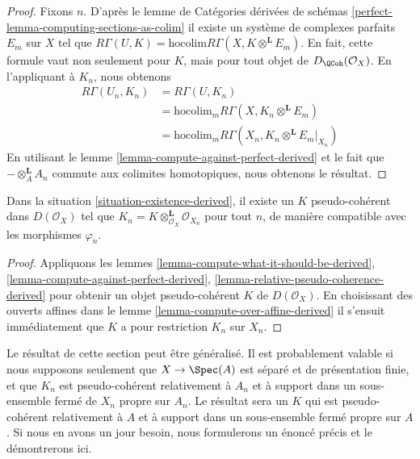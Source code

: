 \begin{proof}
Fixons $n$. D'après le lemme de Catégories dérivées de schémas
\ref{perfect-lemma-computing-sections-as-colim}
il existe un système de complexes parfaits $E_m$
sur $X$ tel que
$R\Gamma(U, K) = \text{hocolim} R\Gamma(X, K \otimes^\mathbf{L} E_m)$.
En fait, cette formule vaut non seulement pour $K$, mais pour tout objet de
$D_\QCoh(\mathcal{O}_X)$.
En l'appliquant à $K_n$,
nous obtenons
\begin{align*}
R\Gamma(U_n, K_n)
& =
R\Gamma(U, K_n) \\
& =
\text{hocolim}_m R\Gamma(X, K_n \otimes^\mathbf{L} E_m) \\
& =
\text{hocolim}_m R\Gamma(X_n, K_n \otimes^\mathbf{L} E_m|_{X_n})
\end{align*}
En utilisant le lemme \ref{lemma-compute-against-perfect-derived}
et le fait que $- \otimes_A^\mathbf{L} A_n$
commute aux colimites homotopiques, nous obtenons le résultat.
\end{proof}

\begin{theorem}
\label{theorem-existence-derived}
Dans la situation \ref{situation-existence-derived},
il existe un $K$ pseudo-cohérent dans $D(\mathcal{O}_X)$
tel que $K_n = K \otimes_{\mathcal{O}_X}^\mathbf{L} \mathcal{O}_{X_n}$
pour tout $n$, de manière compatible avec les morphismes $\varphi_n$.
\end{theorem}

\begin{proof}
Appliquons les lemmes \ref{lemma-compute-what-it-should-be-derived},
\ref{lemma-compute-against-perfect-derived},
\ref{lemma-relative-pseudo-coherence-derived}
pour obtenir un objet pseudo-cohérent $K$ de $D(\mathcal{O}_X)$.
En choisissant des ouverts affines dans le lemme
\ref{lemma-compute-over-affine-derived}
il s'ensuit immédiatement que $K$ a pour restriction $K_n$ sur $X_n$.
\end{proof}

\begin{remark}
\label{remark-correct-generality}
Le résultat de cette section peut être généralisé. Il est probablement valable
si nous supposons seulement que $X \to \Spec(A)$ est séparé et de présentation finie,
et que $K_n$ est pseudo-cohérent relativement à $A_n$ et à support dans un sous-ensemble
fermé de $X_n$ propre sur $A_n$. Le résultat sera un $K$ qui
est pseudo-cohérent relativement à $A$ et à support dans un sous-ensemble fermé
propre sur $A$. Si nous en avons un jour besoin, nous
formulerons un énoncé précis et le démontrerons ici.
\end{remark}






